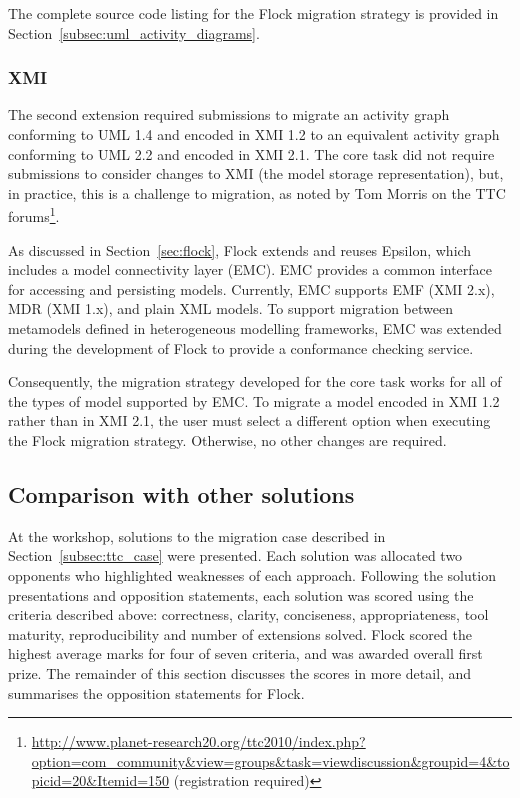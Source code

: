 The complete source code listing for the Flock migration strategy is provided in Section~\ref{subsec:uml_activity_diagrams}.

\subsubsection{XMI}
\label{sec:xmi}
The second extension required submissions to migrate an activity graph conforming to UML 1.4 and encoded in XMI 1.2 to an equivalent activity graph conforming to UML 2.2 and encoded in XMI 2.1. The core task did not require submissions to consider changes to XMI (the model storage representation), but, in practice, this is a challenge to migration, as noted by Tom Morris on the TTC forums\footnote{\url{http://www.planet-research20.org/ttc2010/index.php?option=com_community&view=groups&task=viewdiscussion&groupid=4&topicid=20&Itemid=150} (registration required)}.

As discussed in Section~\ref{sec:flock}, Flock extends and reuses  Epsilon, which includes a model connectivity layer (EMC). EMC provides a common interface for accessing and persisting models. Currently, EMC supports EMF (XMI 2.x), MDR (XMI 1.x), and plain XML models. To support migration between metamodels defined in heterogeneous modelling frameworks, EMC was extended during the development of Flock to provide a conformance checking service.

Consequently, the migration strategy developed for the core task works for all of the types of model supported by EMC. To migrate a model encoded in XMI 1.2 rather than in XMI 2.1, the user must select a different option when executing the Flock migration strategy. Otherwise, no other changes are required.

\subsection{Comparison with other solutions}
At the workshop, solutions to the migration case described in Section~\ref{subsec:ttc_case} were presented. Each solution was allocated two opponents who highlighted weaknesses of each approach. Following the solution presentations and opposition statements, each solution was scored using the criteria described above: correctness, clarity, conciseness, appropriateness, tool maturity, reproducibility and number of extensions solved. Flock scored the highest average marks for four of seven criteria, and was awarded overall first prize. The remainder of this section discusses the scores in more detail, and summarises the opposition statements for Flock.

